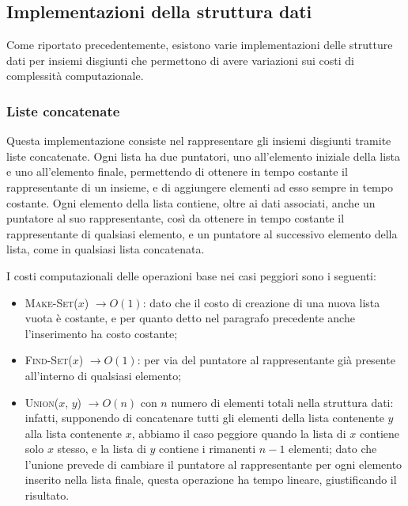 \hfill


\subsection{Implementazioni della struttura dati}
Come riportato precedentemente, esistono varie implementazioni delle strutture
dati per insiemi disgiunti che permettono di avere variazioni sui costi di complessità
computazionale.

\subsubsection{Liste concatenate}
Questa implementazione consiste nel rappresentare gli insiemi disgiunti tramite liste
concatenate. Ogni lista ha due puntatori, uno all'elemento iniziale della lista e uno
all'elemento finale, permettendo di ottenere in tempo costante il rappresentante di un
insieme, e di aggiungere elementi ad esso sempre in tempo costante. Ogni elemento della
lista contiene, oltre ai dati associati, anche un puntatore al suo rappresentante, così da
ottenere in tempo costante il rappresentante di qualsiasi elemento, e un puntatore al
successivo elemento della lista, come in qualsiasi lista concatenata.\newline

I costi computazionali delle operazioni base nei casi peggiori sono i seguenti:
\begin{itemize}
    \item \textsc{Make-Set($x$)} $\rightarrow O(1)$: dato che il costo di creazione di una nuova lista vuota è costante,
          e per quanto detto nel paragrafo precedente anche l'inserimento ha costo costante;
    \item \textsc{Find-Set($x$)} $\rightarrow O(1)$: per via del puntatore al rappresentante già presente all'interno
          di qualsiasi elemento;
    \item \textsc{Union($x$, $y$)} $\rightarrow O(n)$ con $n$ numero di elementi totali nella struttura dati: infatti,
          supponendo di concatenare tutti gli elementi della lista contenente $y$ alla lista contenente $x$, abbiamo il caso
          peggiore quando la lista di $x$ contiene solo $x$ stesso, e la lista di $y$ contiene i rimanenti $n-1$ elementi;
          dato che l'unione prevede di cambiare il puntatore al rappresentante per ogni elemento inserito nella lista finale,
          questa operazione ha tempo lineare, giustificando il risultato.
\end{itemize}

